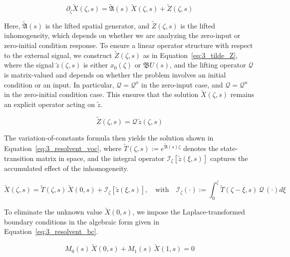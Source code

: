 \begin{equation} \label{eq:3_resolvent_ode}
    \partial_\zeta \tilde{X}(\zeta, s) = \tilde{\mathfrak{A}}(s)\, \tilde{X}(\zeta, s) + \tilde{Z}(\zeta, s)
\end{equation}

Here, $\tilde{\mathfrak{A}}(s)$ is the lifted spatial generator, and $\tilde{Z}(\zeta, s)$ is the lifted inhomogeneity, which depends on whether we are analyzing the zero-input or zero-initial condition response. To ensure a linear operator structure with respect to the external signal, we construct $\tilde{Z}(\zeta, s)$ as in Equation~\eqref{eq:3_tilde_Z}, where the signal $\tilde{z}(\zeta, s)$ is either $x_0(\zeta)$ or $\mathfrak{B} U(s)$, and the lifting operator $\mathcal{Q}$ is matrix-valued and depends on whether the problem involves an initial condition or an input. In particular, $\mathcal{Q} = \mathcal{Q}^x$ in the zero-input case, and $\mathcal{Q} = \mathcal{Q}^u$ in the zero-initial condition case. This ensures that the solution $\tilde{X}(\zeta, s)$ remains an explicit operator acting on $\tilde{z}$.

\begin{equation} \label{eq:3_tilde_Z}
\tilde{Z}(\zeta, s) = \mathcal{Q}\, \tilde{z}(\zeta, s)
\end{equation}

The variation-of-constants formula then yields the solution shown in Equation~\eqref{eq:3_resolvent_voc}, where $\tilde{T}(\zeta, s) := e^{\tilde{\mathfrak{A}}(s) \zeta}$ denotes the state-transition matrix in space, and the integral operator $\mathcal{I}_\zeta[\tilde{z}(\xi, s)]$ captures the accumulated effect of the inhomogeneity.

\begin{equation} \label{eq:3_resolvent_voc}
    \tilde{X}(\zeta, s) = \tilde{T}(\zeta, s)\, \tilde{X}(0, s) + \mathcal{I}_\zeta[\tilde{z}(\xi, s)], \quad \text{with} \quad \mathcal{I}_\zeta(\cdot) := \int_0^\zeta \tilde{T}(\zeta - \xi, s)\, \mathcal{Q}\, (\cdot) d\xi
\end{equation}

To eliminate the unknown value $\tilde{X}(0, s)$, we impose the Laplace-transformed boundary conditions in the algebraic form given in Equation~\eqref{eq:3_resolvent_bc}.

\begin{equation} \label{eq:3_resolvent_bc}
    M_0(s)\, \tilde{X}(0, s) + M_1(s)\, \tilde{X}(1, s) = 0
\end{equation}

